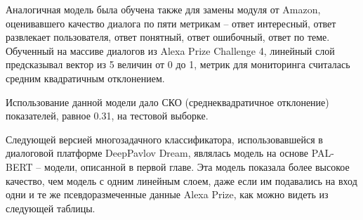 Аналогичная модель была обучена также для замены модуля от Amazon, оценивавшего качество диалога по пяти метрикам -- ответ интересный, ответ развлекает пользователя, ответ понятный, ответ ошибочный, ответ по теме. Обученный на массиве диалогов из Alexa Prize Challenge 4, линейный слой предсказывал вектор из 5 величин от 0 до 1, метрик для мониторинга считалась средним квадратичным отклонением.

Использование данной модели дало СКО (среднеквадратичное отклонение) показателей, равное 0.31, на тестовой выборке.

Следующей версией многозадачного классификатора, использовавшейся в диалоговой платформе DeepPavlov Dream, являлась модель на основе PAL-BERT -- модели, описанной в первой главе. Эта модель показала более высокое качество, чем модель с одним линейным слоем, даже если им подавались на вход одни и те же псевдоразмеченные данные Alexa Prize, как можно видеть из следующей таблицы.

\begin{table}[htbp]
\centering
\caption {Точность (взвешенный-F1) для моделей \underline{без диалоговой истории} для многозадачной модели с 1 линейным слоем и PAL-BERT на псевдоразмеченных данных из Alexa Prize Challenge 4, оценка на «чистых» тестовых данных для не-коботовских задач и на псевдоразмеченных для коботовских задач. «1 в 1» означает оригинальные модели.}
\label{mtldream:4}
\end{table}


